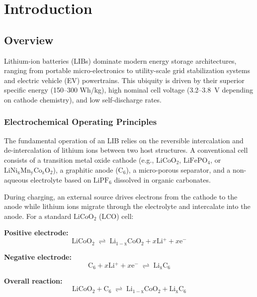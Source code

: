 \chapter{Introduction}  
\label{chap:introduction}

\section{Overview}
\label{sec:overview_lib}

Lithium-ion batteries (LIBs) dominate modern energy storage architectures, ranging from portable micro-electronics to utility-scale grid stabilization systems and electric vehicle (EV) powertrains. This ubiquity is driven by their superior specific energy (150--300 Wh/kg), high nominal cell voltage (3.2--3.8~V depending on cathode chemistry), and low self-discharge rates.

\subsection{Electrochemical Operating Principles}

The fundamental operation of an LIB relies on the reversible intercalation and de-intercalation of lithium ions between two host structures. A conventional cell consists of a transition metal oxide cathode (e.g., $\mathrm{LiCoO_2}$, $\mathrm{LiFePO_4}$, or $\mathrm{LiNi_xMn_yCo_zO_2}$), a graphitic anode ($\mathrm{C_6}$), a micro-porous separator, and a non-aqueous electrolyte based on $\mathrm{LiPF_6}$ dissolved in organic carbonates.

During charging, an external source drives electrons from the cathode to the anode while lithium ions migrate through the electrolyte and intercalate into the anode. For a standard $\mathrm{LiCoO_2}$ (LCO) cell:

\noindent\textbf{Positive electrode:}
\begin{equation}
\label{eq:cathode_rxn}
\mathrm{LiCoO_2} \;\rightleftharpoons\; \mathrm{Li_{1-x}CoO_2} + x\mathrm{Li^+} + x\mathrm{e^-}
\end{equation}

\noindent\textbf{Negative electrode:}
\begin{equation}
\label{eq:anode_rxn}
\mathrm{C_6} + x\mathrm{Li^+} + x\mathrm{e^-} \;\rightleftharpoons\; \mathrm{Li_xC_6}
\end{equation}

\noindent\textbf{Overall reaction:}
\begin{equation}
\label{eq:overall_rxn}
\mathrm{LiCoO_2} + \mathrm{C_6} \;\rightleftharpoons\; \mathrm{Li_{1-x}CoO_2} + \mathrm{Li_xC_6}
\end{equation}

